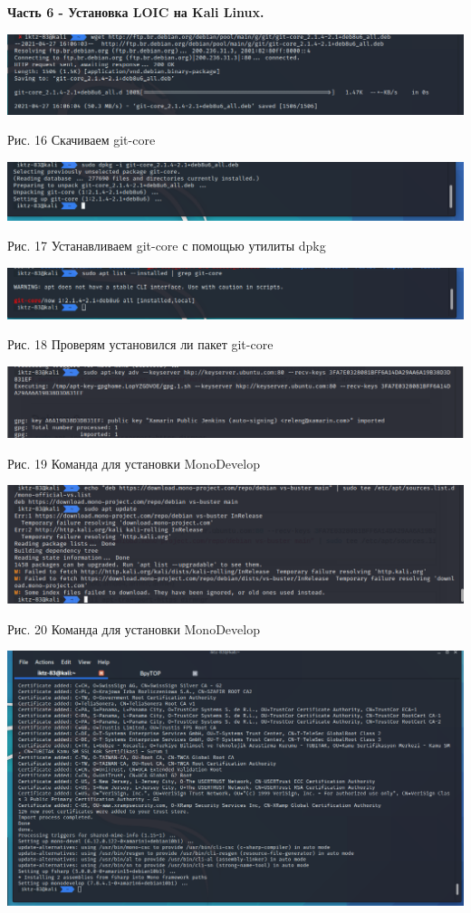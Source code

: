 \documentclass[a4paper,14pt]{extarticle}
\begin{document}
   \textbf{Часть 6 - Установка LOIC на Kali Linux.}
   \begin{center}
        \includegraphics[scale=0.45]{pics/16.png}

        Рис. 16 Скачиваем git-core

        \includegraphics[scale=0.45]{pics/17.png}

        Рис. 17 Устанавливаем git-core с помощью утилиты dpkg 

        \includegraphics[scale=0.45]{pics/18.png}

        Рис. 18 Проверям установился ли пакет git-core

        \includegraphics[scale=0.45]{pics/19.png}

        Рис. 19 Команда для установки MonoDevelop

        \includegraphics[scale=0.45]{pics/20.png}

        Рис. 20 Команда для установки MonoDevelop

        \includegraphics[scale=0.4]{pics/21.png}


\end{center}
\end{document}
